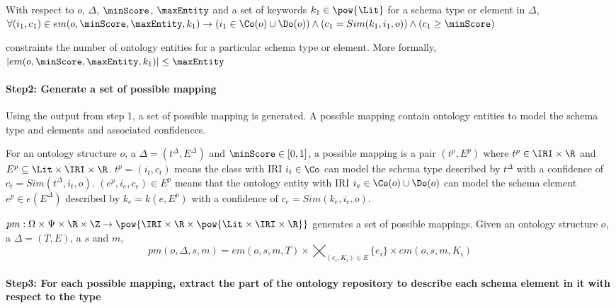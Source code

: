     With respect to $o$, $\Delta$, $\minScore$, $\maxEntity$ and a set of keywords $k_1\in\pow{\Lit}$ for a schema type or element in $\Delta$, $\forall (i_1,c_1)\in em(o,\minScore,\maxEntity,k_1)\rightarrow (i_1\in \Co(o)\cup \Do(o)) \land (c_1=Sim(k_1,i_1,o)) \land (c_1 \geq \minScore)$
    
    \maxEntity constraints the number of ontology entities for a particular schema type or element. More formally, $|em(o,\minScore,\maxEntity,k_1)|\leq\maxEntity$
    
    
    \paragraph{\textbf{Step2}: Generate a set of possible mapping} Using the output from step 1, a set of possible mapping is generated. A possible mapping contain ontology entities to model the schema type and elements and associated confidences. 
    
    \begin{definition}\label{def:possibleMapping}
    	For an ontology structure $o$, a \schemaDescription $\Delta=(t^{\Delta},E^{\Delta})$ and $\minScore\in [0,1]$, a possible mapping is a pair $(t^{p},E^{p})$ where $t^{p}\in\IRI\times\R$ and $E^{p}\subseteq\Lit\times\IRI\times\R$. $t^{p}=(i_t,c_t)$ means the class with IRI $i_t\in\Co$ can model the schema type described by $t^{\Delta}$ with a confidence of $c_t=Sim(t^{\Delta},i_t,o)$. $(e^{p},i_e,c_e)\in E^{p}$ means that the ontology entity with IRI $i_e\in\Co(o)\cup\Do(o)$ can model the schema element $e^{p}\in e(E^{\Delta})$ described by $k_e=k(e,E^{p})$ with a confidence of $c_e=Sim(k_e,i_e,o)$.
    \end{definition} 
    
    
    $pm:\Omega\times\Psi\times\R\times\Z\rightarrow\pow{\IRI\times\R\times\pow{\Lit\times\IRI\times\R}}$ generates a set of possible mappings. Given an ontology structure $o$, a \schemaDescription $\Delta=(T,E)$, a \minScore $s$ and \maxEntity $m$, 
    $$pm(o,\Delta,s,m) = em(o,s,m,T)\times\bigtimes_{(e_i,K_i)\in E} \{e_i\}\times em(o,s,m,K_i)$$
    
    
    \paragraph{\textbf{Step3}: For each possible mapping, extract the part of the ontology repository to describe each schema element in it with respect to the type}
    	
